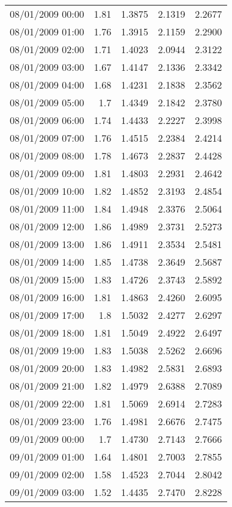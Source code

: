 \begin{longtable}{|l|r|r|r|r|}
08/01/2009 00:00 & 1.81 & 1.3875 & 2.1319 & 2.2677 \\
08/01/2009 01:00 & 1.76 & 1.3915 & 2.1159 & 2.2900 \\
08/01/2009 02:00 & 1.71 & 1.4023 & 2.0944 & 2.3122 \\
08/01/2009 03:00 & 1.67 & 1.4147 & 2.1336 & 2.3342 \\
08/01/2009 04:00 & 1.68 & 1.4231 & 2.1838 & 2.3562 \\
08/01/2009 05:00 & 1.7 & 1.4349 & 2.1842 & 2.3780 \\
08/01/2009 06:00 & 1.74 & 1.4433 & 2.2227 & 2.3998 \\
08/01/2009 07:00 & 1.76 & 1.4515 & 2.2384 & 2.4214 \\
08/01/2009 08:00 & 1.78 & 1.4673 & 2.2837 & 2.4428 \\
08/01/2009 09:00 & 1.81 & 1.4803 & 2.2931 & 2.4642 \\
08/01/2009 10:00 & 1.82 & 1.4852 & 2.3193 & 2.4854 \\
08/01/2009 11:00 & 1.84 & 1.4948 & 2.3376 & 2.5064 \\
08/01/2009 12:00 & 1.86 & 1.4989 & 2.3731 & 2.5273 \\
08/01/2009 13:00 & 1.86 & 1.4911 & 2.3534 & 2.5481 \\
08/01/2009 14:00 & 1.85 & 1.4738 & 2.3649 & 2.5687 \\
08/01/2009 15:00 & 1.83 & 1.4726 & 2.3743 & 2.5892 \\
08/01/2009 16:00 & 1.81 & 1.4863 & 2.4260 & 2.6095 \\
08/01/2009 17:00 & 1.8 & 1.5032 & 2.4277 & 2.6297 \\
08/01/2009 18:00 & 1.81 & 1.5049 & 2.4922 & 2.6497 \\
08/01/2009 19:00 & 1.83 & 1.5038 & 2.5262 & 2.6696 \\
08/01/2009 20:00 & 1.83 & 1.4982 & 2.5831 & 2.6893 \\
08/01/2009 21:00 & 1.82 & 1.4979 & 2.6388 & 2.7089 \\
08/01/2009 22:00 & 1.81 & 1.5069 & 2.6914 & 2.7283 \\
08/01/2009 23:00 & 1.76 & 1.4981 & 2.6676 & 2.7475 \\
09/01/2009 00:00 & 1.7 & 1.4730 & 2.7143 & 2.7666 \\
09/01/2009 01:00 & 1.64 & 1.4801 & 2.7003 & 2.7855 \\
09/01/2009 02:00 & 1.58 & 1.4523 & 2.7044 & 2.8042 \\
09/01/2009 03:00 & 1.52 & 1.4435 & 2.7470 & 2.8228 \\

\end{longtable}
